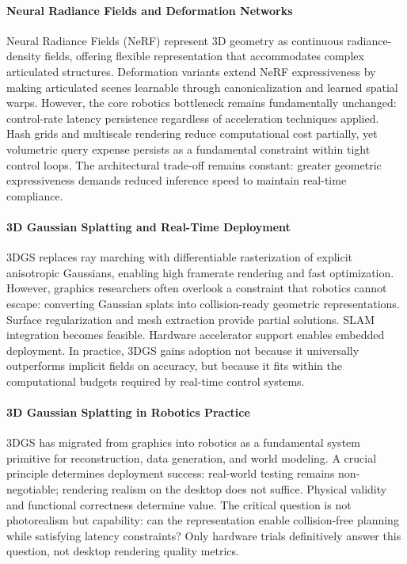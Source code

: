 ﻿\documentclass[11pt,a4paper]{article}
\begin{document}
\paragraph{Neural Radiance Fields and Deformation Networks}
Neural Radiance Fields (NeRF) represent 3D geometry as continuous radiance-density fields, offering flexible representation that accommodates complex articulated structures. Deformation variants extend NeRF expressiveness by making articulated scenes learnable through canonicalization and learned spatial warps. However, the core robotics bottleneck remains fundamentally unchanged: control-rate latency persistence regardless of acceleration techniques applied. Hash grids and multiscale rendering reduce computational cost partially, yet volumetric query expense persists as a fundamental constraint within tight control loops. The architectural trade-off remains constant: greater geometric expressiveness demands reduced inference speed to maintain real-time compliance.

\paragraph{3D Gaussian Splatting and Real-Time Deployment}
3DGS replaces ray marching with differentiable rasterization of explicit anisotropic Gaussians, enabling high framerate rendering and fast optimization. However, graphics researchers often overlook a constraint that robotics cannot escape: converting Gaussian splats into collision-ready geometric representations. Surface regularization and mesh extraction provide partial solutions. SLAM integration becomes feasible. Hardware accelerator support enables embedded deployment. In practice, 3DGS gains adoption not because it universally outperforms implicit fields on accuracy, but because it fits within the computational budgets required by real-time control systems.

\paragraph{3D Gaussian Splatting in Robotics Practice} 
3DGS has migrated from graphics into robotics as a fundamental system primitive for reconstruction, data generation, and world modeling. A crucial principle determines deployment success: real-world testing remains non-negotiable; rendering realism on the desktop does not suffice. Physical validity and functional correctness determine value. The critical question is not photorealism but capability: can the representation enable collision-free planning while satisfying latency constraints? Only hardware trials definitively answer this question, not desktop rendering quality metrics.
\end{document}
